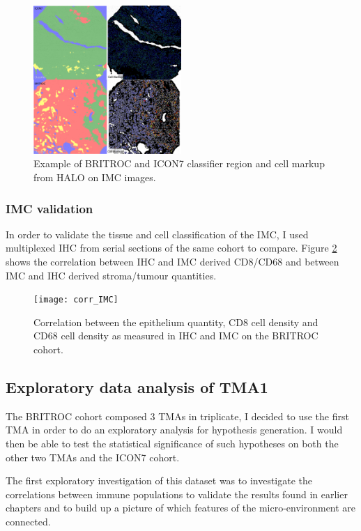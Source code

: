  \begin{figure}
     \centering
     \includegraphics[width=0.5\textwidth]{Chapter4/figs/Thesis-09.png}
     \caption{Example of BRITROC and ICON7 classifier region and cell markup from HALO on IMC images.}
     \label{fig:IMC_example}
 \end{figure}
 
\subsubsection{IMC validation}

In order to validate the tissue and cell classification of the IMC, I used multiplexed IHC from serial sections of the same cohort to compare. Figure \ref{fig:IMC_IHC_corr} shows the correlation between IHC and IMC derived CD8/CD68 and between IMC and IHC derived stroma/tumour quantities.

\begin{figure}
    \centering
    \texttt{[image: corr\_IMC]}
    \caption{Correlation between the epithelium quantity, CD8 cell density and CD68 cell density as measured in IHC and IMC on the BRITROC cohort.}
    \label{fig:IMC_IHC_corr}
\end{figure}

\subsection{Exploratory data analysis of TMA1}

The BRITROC cohort composed 3 TMAs in triplicate, I decided to use the first TMA in order to do an exploratory analysis for hypothesis generation. I would then be able to test the statistical significance of such hypotheses on both the other two TMAs and the ICON7 cohort. 

The first exploratory investigation of this dataset was to investigate the correlations between immune populations to validate the results found in earlier chapters and to build up a picture of which features of the micro-environment are connected.

